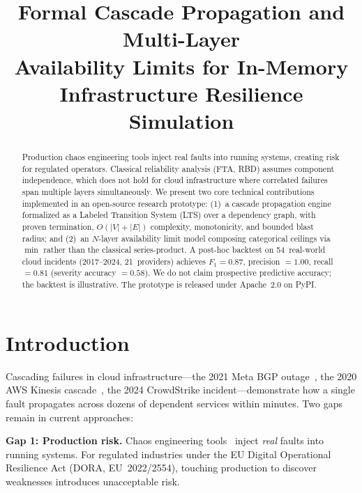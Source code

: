 \documentclass[conference,10pt]{IEEEtran}
\title{Formal Cascade Propagation and Multi-Layer\\Availability Limits for In-Memory\\Infrastructure Resilience Simulation}
\author{\IEEEauthorblockN{Anonymous Author(s)}}
\begin{document}
\maketitle

\begin{abstract}
Production chaos engineering tools inject real faults into running
systems, creating risk for regulated operators. Classical reliability
analysis (FTA, RBD) assumes component independence, which does not
hold for cloud infrastructure where correlated failures span multiple
layers simultaneously.
We present two core technical contributions implemented in an
open-source research prototype:
(1)~a cascade propagation engine formalized as a Labeled Transition
System (LTS) over a dependency graph, with proven termination,
$O(|V|{+}|E|)$ complexity, monotonicity, and bounded blast radius;
and (2)~an $N$-layer availability limit model composing categorical
ceilings via $\min$ rather than the classical series-product.
A post-hoc backtest on 54~real-world cloud incidents (2017--2024,
21~providers) achieves $F_1 = 0.87$, precision $= 1.00$, recall $= 0.81$
(severity accuracy $= 0.58$). We do not claim prospective predictive
accuracy; the backtest is illustrative. The prototype is released
under Apache~2.0 on PyPI.
\end{abstract}

\section{Introduction}\label{sec:intro}

Cascading failures in cloud infrastructure---the 2021 Meta BGP
outage~\cite{meta2021}, the 2020 AWS Kinesis cascade~\cite{aws-kinesis2020},
the 2024 CrowdStrike incident---demonstrate how a single fault
propagates across dozens of dependent services within minutes.
Two gaps remain in current approaches:

\textbf{Gap 1: Production risk.} Chaos engineering
tools~\cite{basiri2016,gremlin2020,steadybit2023,aws-fis} inject
\emph{real} faults into running systems. For regulated industries
under the EU Digital Operational Resilience Act
(DORA, EU~2022/2554), touching production to discover weaknesses
introduces unacceptable risk.
\end{document}

